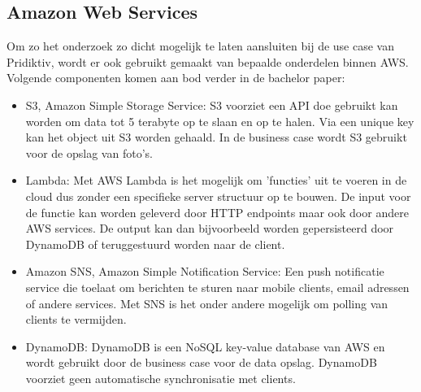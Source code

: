\subsection{Amazon Web Services}
Om zo het onderzoek zo dicht mogelijk te laten aansluiten bij de use case van Pridiktiv, wordt er ook gebruikt gemaakt van bepaalde onderdelen binnen AWS. Volgende componenten komen aan bod verder in de bachelor paper:
\begin{itemize}
\item S3, Amazon Simple Storage Service: S3 voorziet een API doe gebruikt kan worden om data tot 5 terabyte op te slaan en op te halen. Via een unique key kan het object uit S3 worden gehaald. In de business case wordt S3 gebruikt voor de opslag van foto's.
\item Lambda: Met AWS Lambda is het mogelijk om 'functies' uit te voeren in de cloud dus zonder een specifieke server structuur op te bouwen. De input voor de functie kan worden geleverd door HTTP endpoints maar ook door andere AWS services. De output kan dan bijvoorbeeld worden gepersisteerd door DynamoDB of teruggestuurd worden naar de client.
\item Amazon SNS, Amazon Simple Notification Service: Een push notificatie service die toelaat om berichten te sturen naar mobile clients, email adressen of andere services. Met SNS is het onder andere mogelijk om polling van clients te vermijden.
\item DynamoDB: DynamoDB is een NoSQL key-value database van AWS en wordt gebruikt door de business case voor de data opslag. DynamoDB voorziet geen automatische synchronisatie met clients.
\end{itemize}
